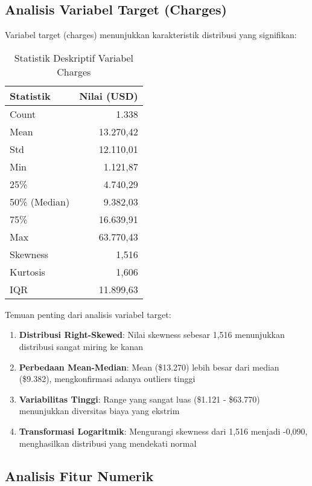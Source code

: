 \subsection{Analisis Variabel Target (Charges)}
\label{subsec:analisis-target}

Variabel target (charges) menunjukkan karakteristik distribusi yang signifikan:

\begin{table}[H]
\centering
\caption{Statistik Deskriptif Variabel Charges}
\label{tab:charges-stats}
\begin{tabular}{|l|r|}
\hline
\textbf{Statistik} & \textbf{Nilai (USD)} \\
\hline
Count & 1.338 \\
Mean & 13.270,42 \\
Std & 12.110,01 \\
Min & 1.121,87 \\
25\% & 4.740,29 \\
50\% (Median) & 9.382,03 \\
75\% & 16.639,91 \\
Max & 63.770,43 \\
\hline
Skewness & 1,516 \\
Kurtosis & 1,606 \\
IQR & 11.899,63 \\
\hline
\end{tabular}
\end{table}

Temuan penting dari analisis variabel target:
\begin{enumerate}
    \item \textbf{Distribusi Right-Skewed}: Nilai skewness sebesar 1,516 menunjukkan distribusi sangat miring ke kanan
    \item \textbf{Perbedaan Mean-Median}: Mean (\$13.270) lebih besar dari median (\$9.382), mengkonfirmasi adanya outliers tinggi
    \item \textbf{Variabilitas Tinggi}: Range yang sangat luas (\$1.121 - \$63.770) menunjukkan diversitas biaya yang ekstrim
    \item \textbf{Transformasi Logaritmik}: Mengurangi skewness dari 1,516 menjadi -0,090, menghasilkan distribusi yang mendekati normal
\end{enumerate}

\subsection{Analisis Fitur Numerik}
\label{subsec:analisis-numerik}

